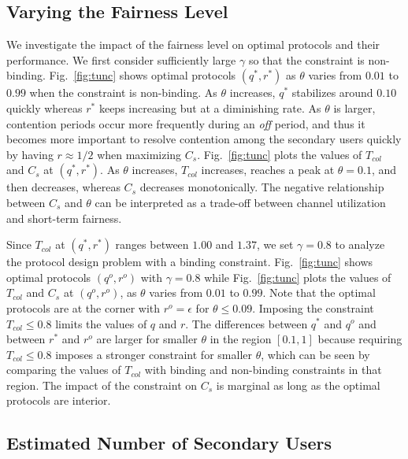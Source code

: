 \documentclass[12pt,draftclsnofoot,onecolumn]{IEEEtran}
\begin{document}
\subsection{Varying the Fairness Level}

We investigate the impact of the fairness level
on optimal protocols and their performance. We first
consider sufficiently large $\gamma$ so that the constraint is non-binding. Fig.~\ref{fig:tunc} shows optimal
protocols $(q^*,r^*)$ as $\theta$ varies from $0.01$ to $0.99$ when the constraint is non-binding.
As $\theta$ increases, $q^*$ stabilizes around $0.10$
quickly whereas $r^*$ keeps increasing but at a diminishing rate.
As $\theta$ is larger, contention periods occur more frequently during an \emph{off} period,
and thus it becomes more important to resolve contention among the secondary users quickly
by having $r \approx 1/2$ when maximizing $C_s$.
Fig.~\ref{fig:tunc} plots the values of $T_{col}$ and $C_s$
at $(q^*,r^*)$. As $\theta$ increases, $T_{col}$ increases, reaches a peak at $\theta = 0.1$,
and then decreases, whereas $C_s$ decreases monotonically. The negative relationship
between $C_s$ and $\theta$ can be interpreted as a trade-off
between channel utilization and short-term fairness.

Since $T_{col}$ at $(q^*,r^*)$ ranges between $1.00$
and $1.37$, we set $\gamma = 0.8$ to analyze the protocol design
problem with a binding constraint.
Fig.~\ref{fig:tunc} shows optimal
protocols $(q^o,r^o)$ with $\gamma = 0.8$ while Fig.~\ref{fig:tunc} plots
the values of $T_{col}$ and $C_s$ at $(q^o,r^o)$, as $\theta$ varies from $0.01$ to $0.99$. Note that the optimal protocols are at the corner
with $r^o = \epsilon$ for $\theta \leq 0.09$. Imposing the constraint $T_{col} \leq 0.8$
limits the values of $q$ and $r$. The differences between $q^*$ and $q^o$ and between $r^*$ and $r^o$
are larger for smaller $\theta$ in the region $[0.1, 1]$ because requiring $T_{col} \leq 0.8$ imposes a stronger constraint
for smaller $\theta$, which can be seen by comparing the values of $T_{col}$
with binding and non-binding constraints in that region. The impact of the constraint on $C_s$ is marginal as long
as the optimal protocols are interior.

\subsection{Estimated Number of Secondary Users}
\end{document}
